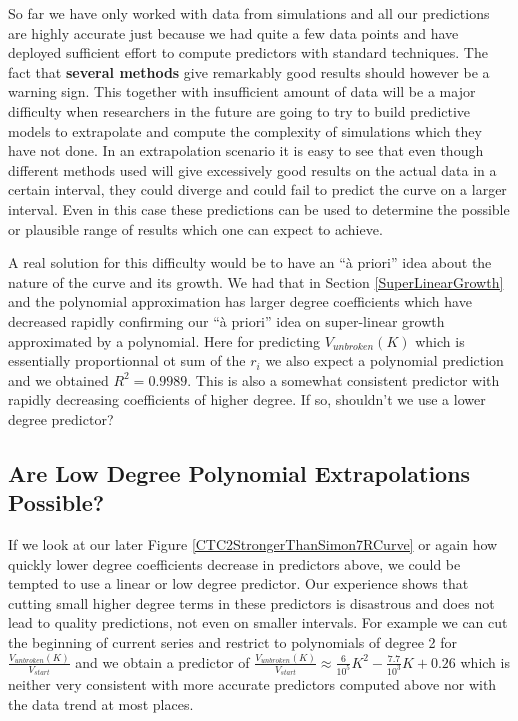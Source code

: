 So far we have only worked with data from simulations and all our predictions are highly accurate
just because we had quite a few data points and have deployed sufficient effort to compute predictors with standard techniques.
The fact that {\bf several methods} give remarkably good results
should however be a warning sign.
This together with insufficient amount of data will be a major difficulty %
when researchers in the future are going to
try to build predictive models to extrapolate and compute the complexity of simulations
which they have not done.
In an extrapolation scenario it is easy to see that %
even though different methods used will give excessively good results on the actual data in a certain interval,
they could diverge and could fail to predict the curve on a larger interval.
Even in this case these predictions can be used to determine
the possible or plausible range of results which one can expect to achieve.

A real solution for this difficulty would be to have an
``\`{a} priori'' idea
about the nature of the curve and its growth.
We had that in Section \ref{SuperLinearGrowth} and the polynomial approximation
has larger degree coefficients which have decreased rapidly
confirming our ``\`{a} priori'' idea on super-linear growth approximated by a polynomial.
Here for predicting $V_{unbroken}(K)$ which is essentially proportionnal ot sum of the $r_i$
we also expect a polynomial prediction and we obtained $R^2=0.9989$.
This is also a somewhat consistent predictor with
rapidly decreasing coefficients of higher degree.
If so, shouldn't we use a lower degree predictor?

\subsection{Are Low Degree Polynomial Extrapolations Possible?}
\label{BigPictureUpAndDownLowDegreeFails}

If we look at our later Figure \ref{CTC2StrongerThanSimon7RCurve} or again how quickly
lower degree coefficients decrease in predictors above,
we could be tempted to use a linear or low degree predictor.
Our experience shows that cutting small higher degree terms in these predictors is disastrous
and does not lead to quality predictions,
not even on smaller intervals.
For example we can cut the beginning of current series
and restrict to polynomials of degree 2 for $\frac{V_{unbroken}(K)}{V_{start}}$
and we obtain a predictor of
$
\frac{V_{unbroken}(K)}{V_{start}}\approx
\frac{6}{10^5}K^2
-\frac{7.7}{10^3}K
+0.26
$
which is neither very consistent with more accurate predictors computed above
nor with the data trend at most places.

